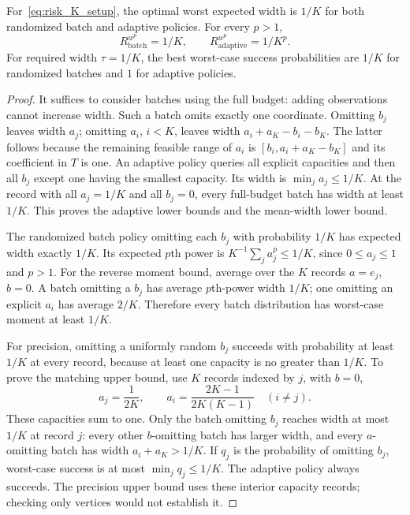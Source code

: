 \begin{theorem}
\label{prop:risk_K_family}
For~\eqref{eq:risk_K_setup}, the optimal worst expected width is $1/K$
for both randomized batch and adaptive policies. For every $p>1$,
\begin{equation}
 R_{\mathrm{batch}}^{w^p}=1/K,\qquad
 R_{\mathrm{adaptive}}^{w^p}=1/K^p.
 \label{eq:risk_K_moments}
\end{equation}
For required width $\tau=1/K$, the best worst-case success probabilities
are $1/K$ for randomized batches and $1$ for adaptive policies.
\end{theorem}
\begin{proof}
It suffices to consider batches using the full budget: adding observations
cannot increase width. Such a batch omits exactly one coordinate.
Omitting $b_j$ leaves width $a_j$; omitting $a_i$, $i<K$, leaves width
$a_i+a_K-b_i-b_K$. The latter follows because the remaining feasible
range of $a_i$ is $[b_i,a_i+a_K-b_K]$ and its coefficient in $T$ is one.
An adaptive policy queries all explicit capacities and then all $b_j$
except one having the smallest capacity. Its width is
$\min_j a_j\le1/K$. At the record with all $a_j=1/K$ and all $b_j=0$,
every full-budget batch has width at least $1/K$. This proves the
adaptive lower bounds and the mean-width lower bound.

The randomized batch policy omitting each $b_j$ with probability $1/K$
has expected width exactly $1/K$. Its expected $p$th power is
$K^{-1}\sum_j a_j^p\le1/K$, since $0\le a_j\le1$ and $p>1$.
For the reverse moment bound, average over the $K$ records
$a=e_j$, $b=0$. A batch omitting a $b_j$ has average $p$th-power width
$1/K$; one omitting an explicit $a_i$ has average $2/K$.
Therefore every batch distribution has worst-case moment at least $1/K$.

For precision, omitting a uniformly random $b_j$ succeeds with
probability at least $1/K$ at every record, because at least one capacity
is no greater than $1/K$. To prove the matching upper bound, use $K$
records indexed by $j$, with $b=0$,
\[
 a_j=\frac{1}{2K},\qquad
 a_i=\frac{2K-1}{2K(K-1)}\quad(i\ne j).
\]
These capacities sum to one. Only the batch omitting $b_j$ reaches
width at most $1/K$ at record $j$: every other $b$-omitting batch has larger
width, and every $a$-omitting batch has width $a_i+a_K>1/K$.
If $q_j$ is the probability of omitting $b_j$, worst-case success is
at most $\min_j q_j\le1/K$. The adaptive policy always succeeds.
The precision upper bound uses these interior capacity records;
checking only vertices would not establish it.
\end{proof}

